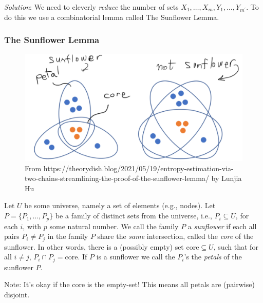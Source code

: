 \textit{Solution}: We need to cleverly \emph{reduce} the number of sets $X_1, \ldots, X_m, Y_1, \ldots, Y_{m^{\prime}}$. To do this we use a combinatorial lemma called The Sunflower Lemma.

\subsubsection{The Sunflower Lemma}

\begin{figure}
    \centering
        \includegraphics[width=0.75\linewidth]{images/sunflower-lemma.png}
    \caption{From https://theorydish.blog/2021/05/19/entropy-estimation-via-two-chains-streamlining-the-proof-of-the-sunflower-lemma/ by Lunjia Hu}
    \label{fig:enter-label}
\end{figure}




\begin{svgraybox}
\begin{definition}[Sunflower] Let $U$ be some universe, namely a set of elements (e.g., nodes). Let $P=\{P_1,\dots,P_p\}$ be a family of distinct sets from the universe, i.e., $P_i\subseteq U$, for each $i$, with $p$ some natural number. 
We call the family $P$ a \emph{sunflower} if each all pairs $P_i \neq P_j$ in the family $P$ share the \emph{same} intersection, called the \emph{core} of the sunflower.
In other words, there is a (possibly empty) set $\mathrm{core}\subseteq U$, such that for all $i\neq j$,  $ P_i\cap P_j = \mathrm{core}$.
If $P$ is a sunflower we call the $P_i$'s the \emph{petals} of the sunflower $P$.
\end{definition}
\end{svgraybox}
Note: It's okay if the core is the empty-set! This means all petals are (pairwise) disjoint.


